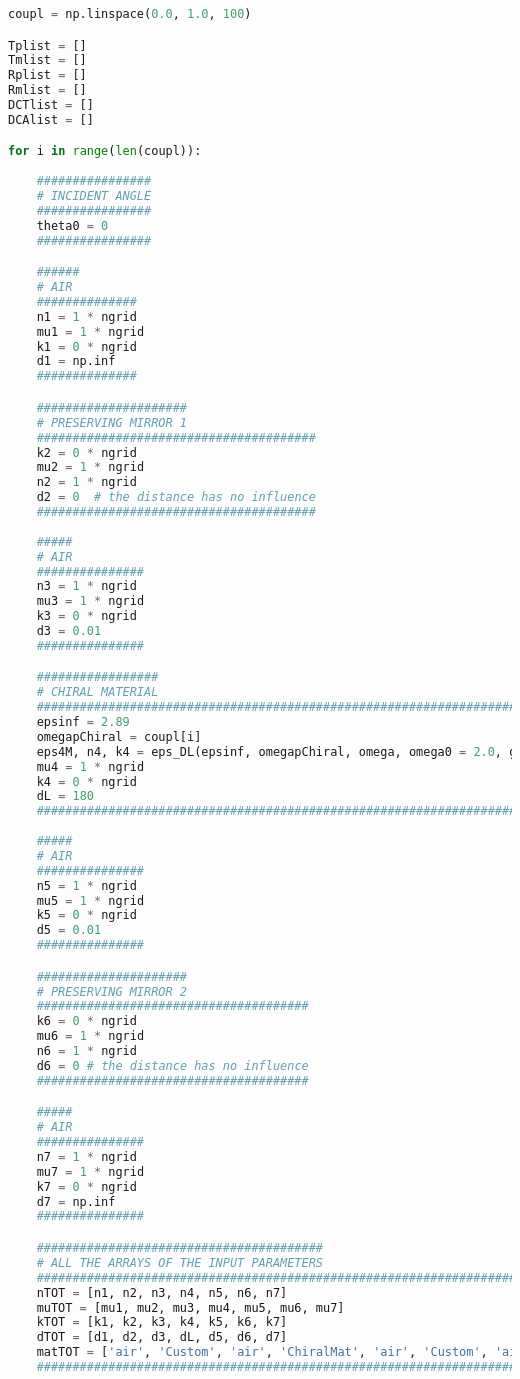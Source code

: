 \documentclass[aps,prl,10pt,onecolumn,superscriptaddress]{revtex4-2}
\begin{document}
\begin{lstlisting}[language=Python, label=multPres, caption=Layers of a preserving FP.]
coupl = np.linspace(0.0, 1.0, 100)

Tplist = []
Tmlist = []
Rplist = []
Rmlist = []
DCTlist = []
DCAlist = []

for i in range(len(coupl)):
    
    ################
    # INCIDENT ANGLE
    ################
    theta0 = 0
    ################

    ######
    # AIR
    ##############
    n1 = 1 * ngrid
    mu1 = 1 * ngrid
    k1 = 0 * ngrid
    d1 = np.inf
    ##############

    #####################
    # PRESERVING MIRROR 1
    #######################################
    k2 = 0 * ngrid
    mu2 = 1 * ngrid
    n2 = 1 * ngrid
    d2 = 0  # the distance has no influence
    #######################################
    
    #####
    # AIR 
    ###############
    n3 = 1 * ngrid
    mu3 = 1 * ngrid
    k3 = 0 * ngrid
    d3 = 0.01
    ###############

    #################
    # CHIRAL MATERIAL
    #########################################################################################
    epsinf = 2.89
    omegapChiral = coupl[i]
    eps4M, n4, k4 = eps_DL(epsinf, omegapChiral, omega, omega0 = 2.0, gamma = 0.05, k0 = 0.0)
    mu4 = 1 * ngrid
    k4 = 0 * ngrid
    dL = 180
    ######################################################################################### 
       
    #####
    # AIR 
    ###############
    n5 = 1 * ngrid
    mu5 = 1 * ngrid
    k5 = 0 * ngrid
    d5 = 0.01
    ###############

    #####################
    # PRESERVING MIRROR 2
    ######################################
    k6 = 0 * ngrid
    mu6 = 1 * ngrid
    n6 = 1 * ngrid
    d6 = 0 # the distance has no influence
    ######################################  

    #####
    # AIR
    ###############
    n7 = 1 * ngrid
    mu7 = 1 * ngrid
    k7 = 0 * ngrid
    d7 = np.inf
    ###############

    ########################################
    # ALL THE ARRAYS OF THE INPUT PARAMETERS
    #############################################################################
    nTOT = [n1, n2, n3, n4, n5, n6, n7]
    muTOT = [mu1, mu2, mu3, mu4, mu5, mu6, mu7]
    kTOT = [k1, k2, k3, k4, k5, k6, k7] 
    dTOT = [d1, d2, d3, dL, d5, d6, d7] 
    matTOT = ['air', 'Custom', 'air', 'ChiralMat', 'air', 'Custom', 'air']
    #############################################################################


\end{lstlisting}
\end{document}
